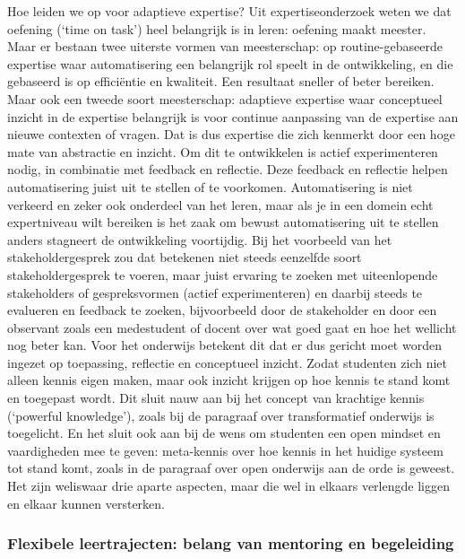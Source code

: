 \documentclass[empirical, authordate, ]{new-jote-article}
\begin{document}
	Hoe leiden we op voor adaptieve expertise? Uit expertiseonderzoek weten we dat oefening (‘time on task') heel belangrijk is in leren: oefening maakt meester. Maar er bestaan twee uiterste vormen van meesterschap: op routine-gebaseerde expertise waar automatisering een belangrijk rol speelt in de ontwikkeling, en die gebaseerd is op efficiëntie en kwaliteit. Een resultaat sneller of beter bereiken. Maar ook een tweede soort meesterschap: adaptieve expertise waar conceptueel inzicht in de expertise belangrijk is voor continue aanpassing van de expertise aan nieuwe contexten of vragen. Dat is dus expertise die zich kenmerkt door een hoge mate van abstractie en inzicht. Om dit te ontwikkelen is actief experimenteren nodig, in combinatie met feedback en reflectie. Deze feedback en reflectie helpen automatisering juist uit te stellen of te voorkomen. Automatisering is niet verkeerd en zeker ook onderdeel van het leren, maar als je in een domein echt expertniveau wilt bereiken is het zaak om bewust automatisering uit te stellen anders stagneert de ontwikkeling voortijdig. Bij het voorbeeld van het stakeholdergesprek zou dat betekenen niet steeds eenzelfde soort stakeholdergesprek te voeren, maar juist ervaring te zoeken met uiteenlopende stakeholders of gespreksvormen (actief experimenteren) en daarbij steeds te evalueren en feedback te zoeken, bijvoorbeeld door de stakeholder en door een observant zoals een medestudent of docent over wat goed gaat en hoe het wellicht nog beter kan. Voor het onderwijs betekent dit dat er dus gericht moet worden ingezet op toepassing, reflectie en conceptueel inzicht. Zodat studenten zich niet alleen kennis eigen maken, maar ook inzicht krijgen op hoe kennis te stand komt en toegepast wordt. Dit sluit nauw aan bij het concept van krachtige kennis (‘powerful knowledge'), zoals bij de paragraaf over transformatief onderwijs is toegelicht. En het sluit ook aan bij de wens om studenten een open mindset en vaardigheden mee te geven: meta-kennis over hoe kennis in het huidige systeem tot stand komt, zoals in de paragraaf over open onderwijs aan de orde is geweest. Het zijn weliswaar drie aparte aspecten, maar die wel in elkaars verlengde liggen en elkaar kunnen versterken.



	\subsubsection{Flexibele leertrajecten: belang van mentoring en begeleiding}
\end{document}
